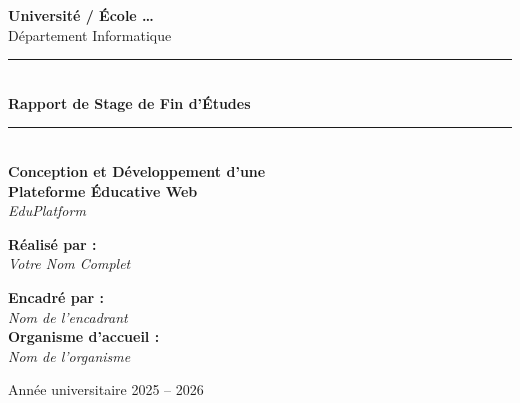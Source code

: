 \begin{titlepage}
\begin{center}


\vspace*{1cm}

{\large \textbf{Université / École …}}\\[0.3cm]
{\large Département Informatique}\\[1.5cm]

\rule{\textwidth}{1.5pt}\\[0.4cm]
{\Huge \bfseries \color{NavyBlue} Rapport de Stage de Fin d'Études}\\[0.3cm]
\rule{\textwidth}{1.5pt}\\[1.5cm]

{\LARGE \bfseries Conception et Développement d'une\\[0.3cm]
Plateforme Éducative Web}\\[0.3cm]
{\Large \textit{EduPlatform}}\\[2cm]

\begin{minipage}[t]{0.45\textwidth}
\begin{flushleft}
\textbf{Réalisé par :}\\
\textit{Votre Nom Complet}
\end{flushleft}
\end{minipage}
\hfill
\begin{minipage}[t]{0.45\textwidth}
\begin{flushright}
\textbf{Encadré par :}\\
\textit{Nom de l'encadrant}\\[0.5cm]
\textbf{Organisme d'accueil :}\\
\textit{Nom de l'organisme}
\end{flushright}
\end{minipage}

\vfill

{\large Année universitaire 2025 -- 2026}

\end{center}
\end{titlepage}
